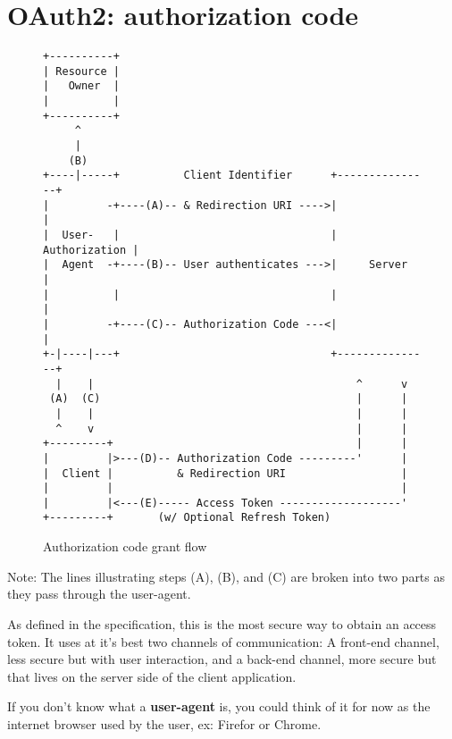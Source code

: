 \section{OAuth2: authorization code}
\label{sec:auth-code}
\begin{figure}[h]
    \centering
    \begin{BVerbatim}
+----------+
| Resource |
|   Owner  |
|          |
+----------+
     ^
     |
    (B)
+----|-----+          Client Identifier      +---------------+
|         -+----(A)-- & Redirection URI ---->|               |
|  User-   |                                 | Authorization |
|  Agent  -+----(B)-- User authenticates --->|     Server    |
|          |                                 |               |
|         -+----(C)-- Authorization Code ---<|               |
+-|----|---+                                 +---------------+
  |    |                                         ^      v
 (A)  (C)                                        |      |
  |    |                                         |      |
  ^    v                                         |      |
+---------+                                      |      |
|         |>---(D)-- Authorization Code ---------'      |
|  Client |          & Redirection URI                  |
|         |                                             |
|         |<---(E)----- Access Token -------------------'
+---------+       (w/ Optional Refresh Token)
    \end{BVerbatim}
    \caption{Authorization code grant flow \cite{ietf-oauth}}
    \label{fig:authorization-code-grant-flow}
\end{figure}
Note: The lines illustrating steps (A), (B), and (C) are broken into
two parts as they pass through the user-agent.

As defined in the specification, this is the most secure way to obtain an access token.
It uses at it's best two channels of communication:
A front-end channel, less secure but with user interaction, and a back-end channel, more
secure but that lives on the server side of the client application.

If you don't know what a \textbf{user-agent} is, you could think of it for now
as the internet browser used by the user, ex: Firefor or Chrome.

